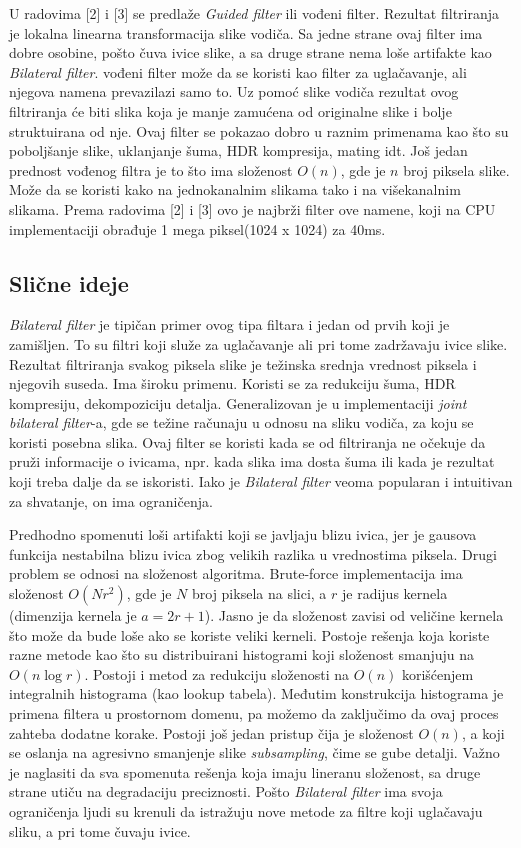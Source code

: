 \documentclass[a4paper,12pt,titlepage]{article}
\begin{document}
U radovima [2] i [3] se predlaže \emph{Guided filter} ili vođeni filter. Rezultat filtriranja je lokalna linearna transformacija slike vodiča. Sa jedne strane ovaj filter ima dobre osobine, pošto čuva ivice slike, a sa druge strane nema loše artifakte kao \emph{Bilateral filter}. vođeni filter može da se koristi kao filter za uglačavanje, ali njegova namena prevazilazi samo to. Uz pomoć slike vodiča rezultat ovog filtriranja će biti slika koja je manje zamućena od originalne slike i bolje struktuirana od nje. Ovaj filter se pokazao dobro u raznim primenama kao što su poboljšanje slike, uklanjanje šuma, HDR kompresija, mating idt. Još jedan prednost vođenog filtra je to što ima složenost $O(n)$, gde je $n$ broj piksela slike. Može da se koristi kako na jednokanalnim slikama tako i na višekanalnim slikama. Prema radovima [2] i [3] ovo je najbrži filter ove namene, koji na CPU implementaciji obrađuje 1 mega piksel(1024 x 1024) za 40ms. 

\subsection{Slične ideje}\label{4.2}%

\emph{Bilateral filter} je tipičan primer ovog tipa filtara i jedan od prvih koji je zamišljen. To su filtri koji služe za uglačavanje ali pri tome zadržavaju ivice slike. Rezultat filtriranja svakog piksela slike je težinska srednja vrednost piksela i njegovih suseda. Ima široku primenu. Koristi se za redukciju šuma, HDR kompresiju, dekompoziciju detalja. Generalizovan je u implementaciji \emph{joint bilateral filter}-a, gde se težine računaju u odnosu na sliku vodiča, za koju se koristi posebna slika. Ovaj filter se koristi kada se od filtriranja ne očekuje da pruži informacije o ivicama, npr. kada slika ima dosta šuma ili kada je rezultat koji treba dalje da se iskoristi. Iako je \emph{Bilateral filter} veoma popularan i intuitivan za shvatanje, on ima ograničenja. 

Predhodno spomenuti loši artifakti koji se javljaju blizu ivica, jer je gausova funkcija nestabilna blizu ivica zbog velikih razlika u vrednostima piksela. Drugi problem se odnosi na složenost algoritma. Brute-force implementacija ima složenost $O(Nr^2)$, gde je $N$ broj piksela na slici, a $r$ je radijus kernela (dimenzija kernela je $a = 2r + 1$). Jasno je da složenost zavisi od veličine kernela što može da bude loše ako se koriste veliki kerneli. Postoje rešenja koja koriste razne metode kao što su distribuirani histogrami koji složenost smanjuju na $O(n \log{r})$. Postoji i metod za redukciju složenosti na $O(n)$ korišćenjem integralnih histograma (kao lookup tabela). Međutim konstrukcija histograma je primena filtera u prostornom domenu, pa možemo da zaključimo da ovaj proces zahteba dodatne korake. Postoji još jedan pristup čija je složenost $O(n)$, a koji se oslanja na agresivno smanjenje slike \emph{subsampling}, čime se gube detalji. Važno je naglasiti da sva spomenuta rešenja koja imaju lineranu složenost, sa druge strane utiču na degradaciju preciznosti. Pošto \emph{Bilateral filter} ima svoja ograničenja ljudi su krenuli da istražuju nove metode za filtre koji uglačavaju sliku, a pri tome čuvaju ivice. 
\end{document}
